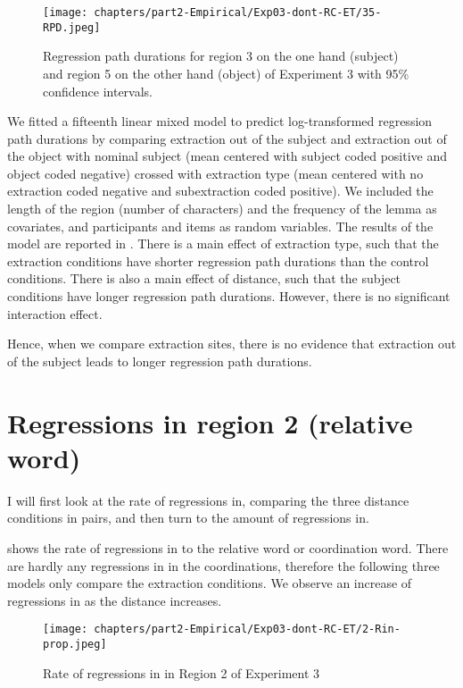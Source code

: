 \begin{figure}
    \centering
    \texttt{[image: chapters/part2-Empirical/Exp03-dont-RC-ET/35-RPD.jpeg]}
    \caption{Regression path durations for region 3 on the one hand (subject) and region 5 on the other hand (object) of Experiment 3 with 95\% confidence intervals.}
    \label{fig:exp03-35-RPD}
\end{figure}

We fitted a fifteenth linear mixed model to predict log-transformed regression path durations by comparing extraction out of the subject and extraction out of the object with nominal subject (mean centered with subject coded positive and object coded negative) crossed with extraction type (mean centered with no extraction coded negative and subextraction coded positive). We included the length of the region (number of characters) and the frequency of the lemma as covariates, and participants and items as random variables. 
The results of the model are reported in . There is a main effect of extraction type, such that the extraction conditions have shorter regression path durations than the control conditions. There is also a main effect of distance, such that the subject conditions have longer regression path durations. However, there is no significant interaction effect. 



Hence, when we compare extraction sites, there is no evidence that extraction out of the subject leads to longer regression path durations. 

\section{Regressions in region 2 (relative word)}\largerpage

I will first look at the rate of regressions in, comparing the three distance conditions in pairs, and then turn to the amount of regressions in. 

 shows the rate of regressions in to the relative word or coordination word. There are hardly any regressions in in the coordinations, therefore the following three models only compare the extraction conditions. We observe an increase of regressions in as the distance increases.

\begin{figure}
    \centering
    \texttt{[image: chapters/part2-Empirical/Exp03-dont-RC-ET/2-Rin-prop.jpeg]}
    \caption{Rate of regressions in in Region 2 of Experiment 3}
    \label{fig:exp03-2-Rin-prop}
\end{figure}

